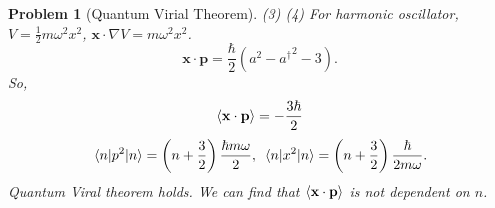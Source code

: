 \documentclass{article}
\theoremstyle{1}
\newtheorem{problem}{Problem}
\begin{document}
\begin{problem}[Quantum Virial Theorem]
    (3) 
    \newline
    (4) For harmonic oscillator, $V=\frac{1}{2}m\omega^2x^2$, $\mathbf{x}\cdot\nabla V=m\omega^2x^2$.
    \begin{equation}
        \mathbf{x}\cdot\mathbf{p}=\frac{\hbar}{2}\left(a^2-{a^\dagger}^2-3\right).
    \end{equation}
    So,
    \begin{equation}
        \expval{\mathbf{x}\cdot\mathbf{p}}=-\frac{3\hbar}{2}
    \end{equation}
    \begin{equation}
        \expval{p^2}{n}=\left(n+\frac{3}{2}\right)\frac{\hbar m \omega}{2},\ \expval{x^2}{n}=\left(n+\frac{3}{2}\right)\frac{\hbar}{2m\omega}.
    \end{equation}
Quantum Viral theorem holds. We can find that $\expval{\mathbf{x}\cdot\mathbf{p}}$ is not dependent on $n$.
\end{problem}
\end{document}
